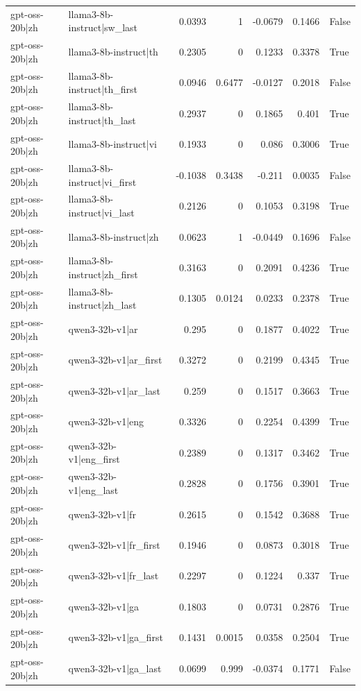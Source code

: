 \begin{table}
\begin{tabular}{l l r r r r l}
gpt-oss-20b|zh & llama3-8b-instruct|sw_last & 0.0393 & 1 & -0.0679 & 0.1466 & False \\
gpt-oss-20b|zh & llama3-8b-instruct|th & 0.2305 & 0 & 0.1233 & 0.3378 & True \\
gpt-oss-20b|zh & llama3-8b-instruct|th_first & 0.0946 & 0.6477 & -0.0127 & 0.2018 & False \\
gpt-oss-20b|zh & llama3-8b-instruct|th_last & 0.2937 & 0 & 0.1865 & 0.401 & True \\
gpt-oss-20b|zh & llama3-8b-instruct|vi & 0.1933 & 0 & 0.086 & 0.3006 & True \\
gpt-oss-20b|zh & llama3-8b-instruct|vi_first & -0.1038 & 0.3438 & -0.211 & 0.0035 & False \\
gpt-oss-20b|zh & llama3-8b-instruct|vi_last & 0.2126 & 0 & 0.1053 & 0.3198 & True \\
gpt-oss-20b|zh & llama3-8b-instruct|zh & 0.0623 & 1 & -0.0449 & 0.1696 & False \\
gpt-oss-20b|zh & llama3-8b-instruct|zh_first & 0.3163 & 0 & 0.2091 & 0.4236 & True \\
gpt-oss-20b|zh & llama3-8b-instruct|zh_last & 0.1305 & 0.0124 & 0.0233 & 0.2378 & True \\
gpt-oss-20b|zh & qwen3-32b-v1|ar & 0.295 & 0 & 0.1877 & 0.4022 & True \\
gpt-oss-20b|zh & qwen3-32b-v1|ar_first & 0.3272 & 0 & 0.2199 & 0.4345 & True \\
gpt-oss-20b|zh & qwen3-32b-v1|ar_last & 0.259 & 0 & 0.1517 & 0.3663 & True \\
gpt-oss-20b|zh & qwen3-32b-v1|eng & 0.3326 & 0 & 0.2254 & 0.4399 & True \\
gpt-oss-20b|zh & qwen3-32b-v1|eng_first & 0.2389 & 0 & 0.1317 & 0.3462 & True \\
gpt-oss-20b|zh & qwen3-32b-v1|eng_last & 0.2828 & 0 & 0.1756 & 0.3901 & True \\
gpt-oss-20b|zh & qwen3-32b-v1|fr & 0.2615 & 0 & 0.1542 & 0.3688 & True \\
gpt-oss-20b|zh & qwen3-32b-v1|fr_first & 0.1946 & 0 & 0.0873 & 0.3018 & True \\
gpt-oss-20b|zh & qwen3-32b-v1|fr_last & 0.2297 & 0 & 0.1224 & 0.337 & True \\
gpt-oss-20b|zh & qwen3-32b-v1|ga & 0.1803 & 0 & 0.0731 & 0.2876 & True \\
gpt-oss-20b|zh & qwen3-32b-v1|ga_first & 0.1431 & 0.0015 & 0.0358 & 0.2504 & True \\
gpt-oss-20b|zh & qwen3-32b-v1|ga_last & 0.0699 & 0.999 & -0.0374 & 0.1771 & False \\

\end{tabular}
\end{table}
